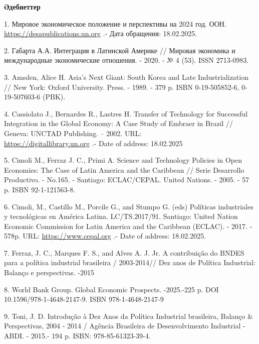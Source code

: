 \begin{center}
{\bfseries Әдебиеттер}
\end{center}

\begin{references}
1. Мировое экономическое положение и перспективы на 2024 год. ООН.
\href{https://desapublications.un.org/sites/default/files/publications/2024-03/WESP\%202024_Executive\%20Summary_Russian_0.pdf}{https://desapublications.un.org}
.- Дата обращения: 18.02.2025.

2. Габарта А.А. Интеграция в Латинской Америке // Мировая экономика и
международные экономические отношения. - 2020. - № 4 (53). ISSN
2713-0983.

3. Amsden, Alice H. Asia's Next Giant: South Korea and Late
Industrialization // New York: Oxford University. Press. - 1989. - 379
p. ISBN 0-19-505852-6, 0-19-507603-6 (PBK).

4. Cassiolato J., Bernardes R., Lastres H. Transfer of Technology for
Successful Integration in the Global Economy: A Case Study of Embraer in
Brazil // Geneva: UNCTAD Publishing. -- 2002. URL:\\
\href{https://digitallibrary.un.org/record/479842?v=pdf}{https://digitallibrary.un.org} .- Date of
address: 18.02.2025

5. Cimoli M., Ferraz J. C., Primi A. Science and Technology Policies in
Open Economies: The Case of Latin America and the Caribbean // Serie
Desarrollo Productivo. - No.165. - Santiago: ECLAC/CEPAL. United
Nations. - 2005. - 57 p. ISBN 92-1-121563-8.

6. Cimoli, M., Castillo M., Porcile G., and Stumpo G. (eds) Políticas
industriales y tecnológicas en América Latina. LC/TS.2017/91. Santiago:
United Nation Economic Commission for Latin America and the Carib\-bean
(ECLAC). - 2017. - 578p. URL:
\href{https://www.cepal.org/es/publicaciones/42363-politicasindustriales-tecnologicas-america-latina}{https://www.cepal.org} .-
Date of address: 18.02.2025.

7. Ferraz, J. C., Marques F. S., and Alves A. J. Jr. A contribuição do
BNDES para a política industrial brasileira / 2003-2014// Dez anos de
Política Industrial: Balanço e perspectivas. -2015

8. World Bank Group. Global Economic Prospects. -2025.-225 p. DOI
10.1596/978-1-4648-2147-9. ISBN 978-1-4648-2147-9

9. Toni, J. D. Introdução à Dez Anos da Política Industrial brasileira,
Balanço \& Perspectivas, 2004 - 2014 / Agência Brasileira de
Desenvolvimento Industrial - ABDI. - 2015.- 194 p. ISBN:
978-85-61323-39-4.


\end{references}
